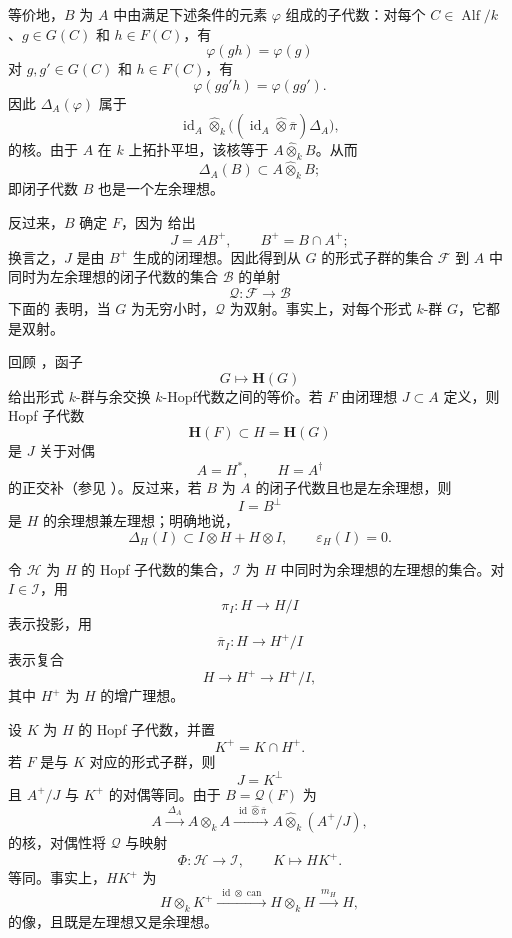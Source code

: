 等价地，\(B\) 为 \(A\) 中由满足下述条件的元素 \(\varphi\) 组成的子代数：对每个 \(C\in\operatorname{Alf}/k\)、\(g\in G(C)\) 和 \(h\in F(C)\)，有
\[
  \varphi(gh)=\varphi(g)
\]
对 \(g,g'\in G(C)\) 和 \(h\in F(C)\)，有
\[
  \varphi(gg'h)=\varphi(gg').
\]
因此 \(\Delta_A(\varphi)\) 属于
\[
  \operatorname{id}_A\widehat\otimes_k
  \bigl((\operatorname{id}_A\widehat\otimes\overline\pi)
        \Delta_A\bigr),
\]
的核。由于 \(A\) 在 \(k\) 上拓扑平坦，该核等于 \(A\widehat\otimes_kB\)。从而
\[
  \Delta_A(B)\subset A\widehat\otimes_kB;
\]
即闭子代数 \(B\) 也是一个左余理想。

反过来，\(B\) 确定 \(F\)，因为  给出
\[
  J=AB^+,
  \qquad
  B^+=B\cap A^+;
\]
换言之，\(J\) 是由 \(B^+\) 生成的闭理想。因此得到从 \(G\) 的形式子群的集合 \(\mathcal F\) 到 \(A\) 中同时为左余理想的闭子代数的集合 \(\mathcal B\) 的单射
\[
  \mathcal Q:\mathcal F\longrightarrow\mathcal B
\]
下面的  表明，当 \(G\) 为无穷小时，\(\mathcal Q\) 为双射。事实上，对每个形式 \(k\)-群 \(G\)，它都是双射。

回顾 ，函子
\[
  G\longmapsto\mathbf H(G)
\]
给出形式 \(k\)-群与余交换 \(k\)-Hopf代数之间的等价。若 \(F\) 由闭理想 \(J\subset A\) 定义，则 Hopf 子代数
\[
  \mathbf H(F)\subset H=\mathbf H(G)
\]
是 \(J\) 关于对偶
\[
  A=H^*,
  \qquad
  H=A^\dagger
\]
的正交补\textup{（参见 ）}。反过来，若 \(B\) 为 \(A\) 的闭子代数且也是左余理想，则
\[
  I=B^\perp
\]
是 \(H\) 的余理想兼左理想；明确地说，
\[
  \Delta_H(I)\subset I\otimes H+H\otimes I,
  \qquad
  \varepsilon_H(I)=0.
\]

令 \(\mathcal H\) 为 \(H\) 的 Hopf 子代数的集合，\(\mathcal I\) 为 \(H\) 中同时为余理想的左理想的集合。对 \(I\in\mathcal I\)，用
\[
  \pi_I:H\longrightarrow H/I
\]
表示投影，用
\[
  \overline\pi_I:H\longrightarrow H^+/I
\]
表示复合
\[
  H\longrightarrow H^+\longrightarrow H^+/I,
\]
其中 \(H^+\) 为 \(H\) 的增广理想。

设 \(K\) 为 \(H\) 的 Hopf 子代数，并置
\[
  K^+=K\cap H^+.
\]
若 \(F\) 是与 \(K\) 对应的形式子群，则
\[
  J=K^\perp
\]
且 \(A^+/J\) 与 \(K^+\) 的对偶等同。由于 \(B=\mathcal Q(F)\) 为
\[
  A
  \xrightarrow{\ \Delta_A\ }
  A\widehat\otimes_kA
  \xrightarrow{\ \operatorname{id}\widehat\otimes\overline\pi\ }
  A\widehat\otimes_k(A^+/J),
\]
的核，对偶性将 \(\mathcal Q\) 与映射
\[
  \Phi:\mathcal H\longrightarrow\mathcal I,
  \qquad
  K\longmapsto HK^+.
\]
等同。事实上，\(HK^+\) 为
\[
  H\otimes_kK^+
  \xrightarrow{\ \operatorname{id}\otimes\operatorname{can}\ }
  H\otimes_kH
  \xrightarrow{\ m_H\ }
  H,
\]
的像，且既是左理想又是余理想。

